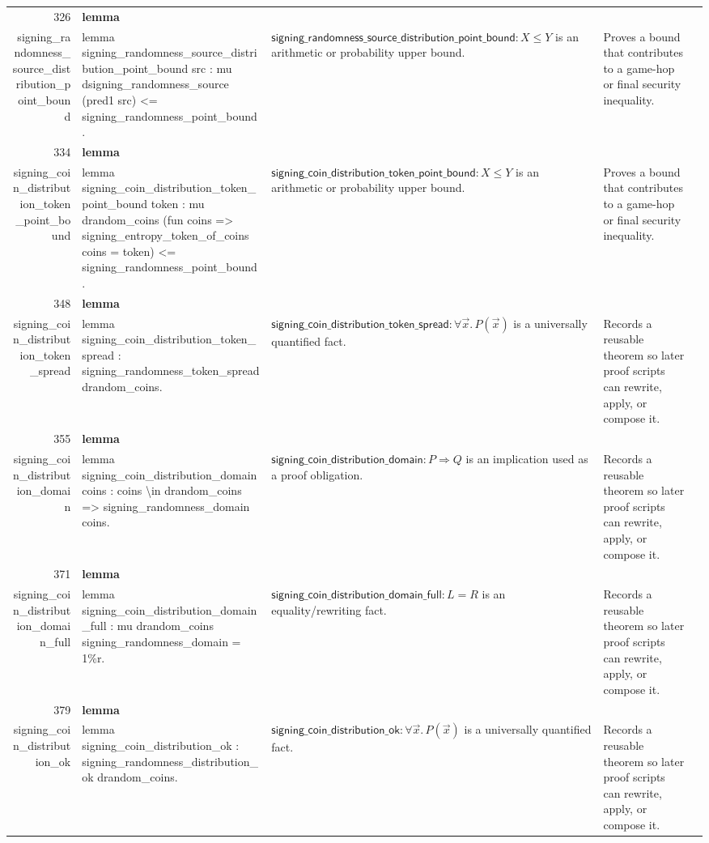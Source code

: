 \documentclass[10pt]{article}
\newcommand{\ec}[1]{\begingroup\ttfamily\scriptsize #1\endgroup}
\begin{document}
\begin{longtable}{r L{0.17\textwidth} L{0.26\textwidth} L{0.27\textwidth} L{0.20\textwidth}}
326 & \textbf{lemma}\\\ec{signing\_randomness\_source\_distribution\_point\_bound} & \ec{lemma signing\_randomness\_source\_distribution\_point\_bound src : mu dsigning\_randomness\_source (pred1 src) <= signing\_randomness\_point\_bound.} & \(\mathsf{signing\_randomness\_source\_distribution\_point\_bound} : X \le Y\) is an arithmetic or probability upper bound. & Proves a bound that contributes to a game-hop or final security inequality. \\
334 & \textbf{lemma}\\\ec{signing\_coin\_distribution\_token\_point\_bound} & \ec{lemma signing\_coin\_distribution\_token\_point\_bound token : mu drandom\_coins (fun coins => signing\_entropy\_token\_of\_coins coins = token) <= signing\_randomness\_point\_bound.} & \(\mathsf{signing\_coin\_distribution\_token\_point\_bound} : X \le Y\) is an arithmetic or probability upper bound. & Proves a bound that contributes to a game-hop or final security inequality. \\
348 & \textbf{lemma}\\\ec{signing\_coin\_distribution\_token\_spread} & \ec{lemma signing\_coin\_distribution\_token\_spread : signing\_randomness\_token\_spread drandom\_coins.} & \(\mathsf{signing\_coin\_distribution\_token\_spread} : \forall \vec{x}.\, P(\vec{x})\) is a universally quantified fact. & Records a reusable theorem so later proof scripts can rewrite, apply, or compose it. \\
355 & \textbf{lemma}\\\ec{signing\_coin\_distribution\_domain} & \ec{lemma signing\_coin\_distribution\_domain coins : coins \textbackslash{}in drandom\_coins => signing\_randomness\_domain coins.} & \(\mathsf{signing\_coin\_distribution\_domain} : P \Rightarrow Q\) is an implication used as a proof obligation. & Records a reusable theorem so later proof scripts can rewrite, apply, or compose it. \\
371 & \textbf{lemma}\\\ec{signing\_coin\_distribution\_domain\_full} & \ec{lemma signing\_coin\_distribution\_domain\_full : mu drandom\_coins signing\_randomness\_domain = 1\%r.} & \(\mathsf{signing\_coin\_distribution\_domain\_full} : L = R\) is an equality/rewriting fact. & Records a reusable theorem so later proof scripts can rewrite, apply, or compose it. \\
379 & \textbf{lemma}\\\ec{signing\_coin\_distribution\_ok} & \ec{lemma signing\_coin\_distribution\_ok : signing\_randomness\_distribution\_ok drandom\_coins.} & \(\mathsf{signing\_coin\_distribution\_ok} : \forall \vec{x}.\, P(\vec{x})\) is a universally quantified fact. & Records a reusable theorem so later proof scripts can rewrite, apply, or compose it. \\

\end{longtable}
\end{document}
